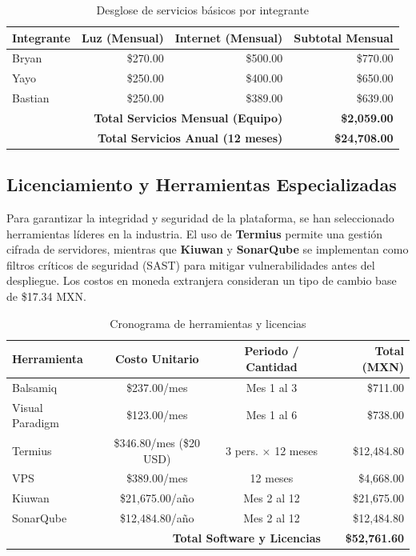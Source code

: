 \begin{table}[h!]
\centering
\caption{Desglose de servicios básicos por integrante}
\begin{tabular}{|l|r|r|r|}
\hline
\textbf{Integrante} & \textbf{Luz (Mensual)} & \textbf{Internet (Mensual)} & \textbf{Subtotal Mensual} \\ \hline
Bryan & \$270.00 & \$500.00 & \$770.00 \\ \hline
Yayo & \$250.00 & \$400.00 & \$650.00 \\ \hline
Bastian & \$250.00 & \$389.00 & \$639.00 \\ \hline
\multicolumn{3}{|r|}{\textbf{Total Servicios Mensual (Equipo)}} & \textbf{\$2,059.00} \\ \hline
\multicolumn{3}{|r|}{\textbf{Total Servicios Anual (12 meses)}} & \textbf{\$24,708.00} \\ \hline
\end{tabular}
\end{table}

\subsection{Licenciamiento y Herramientas Especializadas}

Para garantizar la integridad y seguridad de la plataforma, se han seleccionado herramientas líderes en la industria. El uso de \textbf{Termius} permite una gestión cifrada de servidores, mientras que \textbf{Kiuwan} y \textbf{SonarQube} se implementan como filtros críticos de seguridad (SAST) para mitigar vulnerabilidades antes del despliegue. Los costos en moneda extranjera consideran un tipo de cambio base de \$17.34 MXN.

\begin{table}[h!]
\centering
\caption{Cronograma de herramientas y licencias}
\begin{tabular}{|l|c|c|r|}
\hline
\textbf{Herramienta} & \textbf{Costo Unitario} & \textbf{Periodo / Cantidad} & \textbf{Total (MXN)} \\ \hline
Balsamiq & \$237.00/mes & Mes 1 al 3 & \$711.00 \\ \hline
Visual Paradigm & \$123.00/mes & Mes 1 al 6 & \$738.00 \\ \hline
Termius & \$346.80/mes (\$20 USD) & 3 pers. $\times$ 12 meses & \$12,484.80 \\ \hline
VPS & \$389.00/mes & 12 meses & \$4,668.00 \\ \hline
Kiuwan & \$21,675.00/año & Mes 2 al 12 & \$21,675.00 \\ \hline
SonarQube & \$12,484.80/año & Mes 2 al 12 & \$12,484.80 \\ \hline
\multicolumn{3}{|r|}{\textbf{Total Software y Licencias}} & \textbf{\$52,761.60} \\ \hline
\end{tabular}
\end{table}

